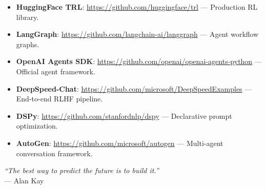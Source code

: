 \begin{itemize}
  \item \textbf{HuggingFace TRL}: \href{https://github.com/huggingface/trl}{https://github.com/huggingface/trl} --- Production RL library.
  \item \textbf{LangGraph}: \href{https://github.com/langchain-ai/langgraph}{https://github.com/langchain-ai/langgraph} --- Agent workflow graphs.
  \item \textbf{OpenAI Agents SDK}: \href{https://github.com/openai/openai-agents-python}{https://github.com/openai/openai-agents-python} --- Official agent framework.
  \item \textbf{DeepSpeed-Chat}: \href{https://github.com/microsoft/DeepSpeedExamples}{https://github.com/microsoft/DeepSpeedExamples} --- End-to-end RLHF pipeline.
  \item \textbf{DSPy}: \href{https://github.com/stanfordnlp/dspy}{https://github.com/stanfordnlp/dspy} --- Declarative prompt optimization.
  \item \textbf{AutoGen}: \href{https://github.com/microsoft/autogen}{https://github.com/microsoft/autogen} --- Multi-agent conversation framework.
\end{itemize}

\emph{``The best way to predict the future is to build it.''}\\

--- Alan Kay





